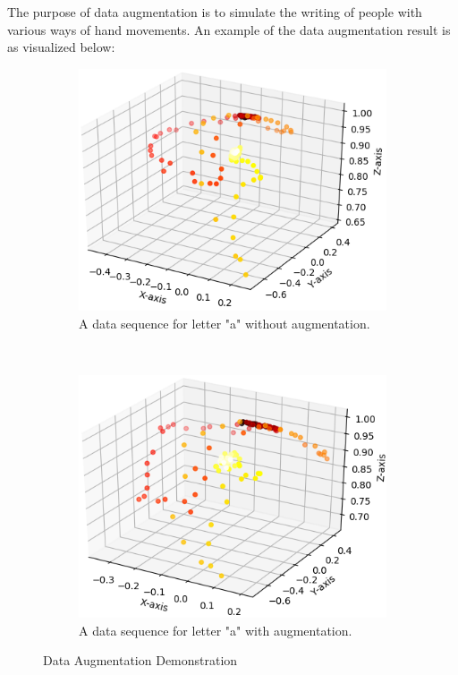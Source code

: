 \documentclass{article}
\begin{document}
\begin{multicols*}{2}
The purpose of data augmentation is to simulate the writing of people with various ways of hand movements. An example of the data augmentation result is as visualized below:

\begin{figure}[H]
    \centering
    \begin{subfigure}[]{0.25\textwidth}
        \centering
        \includegraphics[scale = 0.35 ]{Still_a_5.png}
        \caption{A data sequence for letter "a" without augmentation.}
    \end{subfigure}%
    ~
    \begin{subfigure}[]{0.25\textwidth}
        \centering
        \includegraphics[scale = 0.35]{Still_a_5_aug.png}
        \caption{A data sequence for letter "a" with augmentation.}
    \end{subfigure}
    \caption{Data Augmentation Demonstration}
\end{figure}



\end{multicols*}
\end{document}
